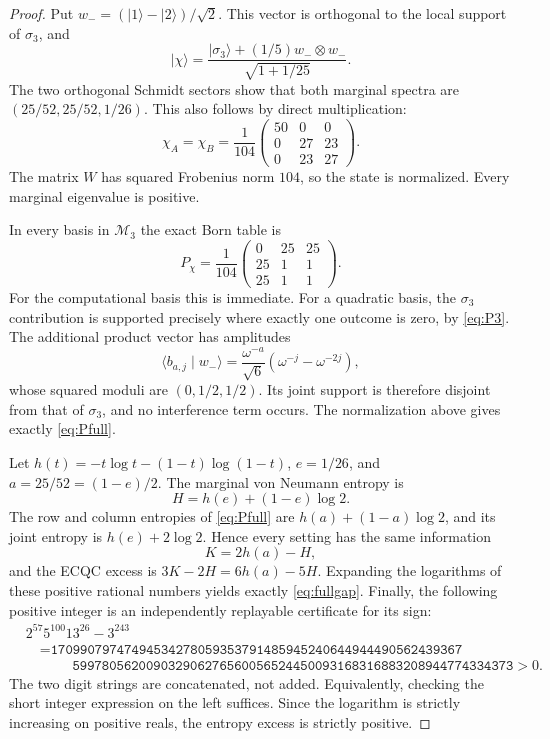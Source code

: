 \documentclass[11pt]{article}
\theoremstyle{remark}
\newcommand{\M}{\mathcal M}
\newcommand{\ket}[1]{\lvert #1\rangle}
\begin{document}
\begin{proof}
Put $w_-=(\ket1-\ket2)/\sqrt2$. This vector is orthogonal to the local support of $\sigma_3$, and
\[
 \ket\chi=\frac{\ket{\sigma_3}+(1/5)w_-\otimes w_-}{\sqrt{1+1/25}}.
\]
The two orthogonal Schmidt sectors show that both marginal spectra are
$(25/52,25/52,1/26)$. This also follows by direct multiplication:
\[
 \chi_A=\chi_B=\frac1{104}
 \begin{pmatrix}50&0&0\\0&27&23\\0&23&27\end{pmatrix}.
\]
The matrix $W$ has squared Frobenius norm $104$, so the state is normalized. Every marginal eigenvalue is positive.

In every basis in $\M_3$ the exact Born table is
\begin{equation}\label{eq:Pfull}
 P_\chi=\frac1{104}\begin{pmatrix}0&25&25\\25&1&1\\25&1&1\end{pmatrix}.
\end{equation}
For the computational basis this is immediate. For a quadratic basis, the $\sigma_3$ contribution is supported precisely where exactly one outcome is zero, by \eqref{eq:P3}. The additional product vector has amplitudes
\[
 \langle b_{a,j}\mid w_-\rangle
 =\frac{\omega^{-a}}{\sqrt6}(\omega^{-j}-\omega^{-2j}),
\]
whose squared moduli are $(0,1/2,1/2)$. Its joint support is therefore disjoint from that of $\sigma_3$, and no interference term occurs. The normalization above gives exactly \eqref{eq:Pfull}.

Let $h(t)=-t\log t-(1-t)\log(1-t)$, $e=1/26$, and $a=25/52=(1-e)/2$. The marginal von Neumann entropy is
\[
 H=h(e)+(1-e)\log2.
\]
The row and column entropies of \eqref{eq:Pfull} are $h(a)+(1-a)\log2$, and its joint entropy is $h(e)+2\log2$. Hence every setting has the same information
\[
 K=2h(a)-H,
\]
and the ECQC excess is $3K-2H=6h(a)-5H$. Expanding the logarithms of these positive rational numbers yields exactly \eqref{eq:fullgap}. Finally, the following positive integer is an independently replayable certificate for its sign:
\begin{align*}
 &2^{57}5^{100}13^{26}-3^{243}\\
 &\quad=\texttt{17099079747494534278059353791485945240644944490562439367}\\[-2pt]
 &\qquad\phantom{=}\texttt{599780562009032906276560056524450093168316883208944774334373}>0.
\end{align*}
The two digit strings are concatenated, not added. Equivalently, checking the short integer expression on the left suffices. Since the logarithm is strictly increasing on positive reals, the entropy excess is strictly positive.
\end{proof}
\end{document}
